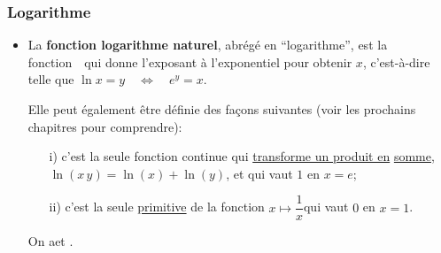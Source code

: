 \documentclass[10pt]{beamer}
\newcommand{\bitem}{\item[$\bullet$]}
\newcommand{\R}{\mathbb R}
\begin{document}
\begin{frame}[plain]
\frametitle{\bf Logarithme}
\medskip 

\begin{itemize}
\bitem
La {\bf fonction logarithme naturel}, abr\'eg\'e en ``logarithme'', 
est la fonction\ \ qui donne l'exposant \`a 
l'exponentiel pour obtenir $x$, c'est-\`a-dire telle que\quad 
$\ln x = y \quad\Leftrightarrow\quad e^y=x$. 
\vspace*{3mm}

\pause
Elle peut \'egalement \^etre d\'efinie des fa\c{c}ons suivantes 
(voir les prochains chapitres pour comprendre): 
\vspace*{2mm}

\begin{itemize}
\item[i)]
c'est la seule fonction continue qui \underline{transforme un produit en} 
\underline{somme}, $\ln(x\,y)=\ln(x)+ \ln(y)$, et qui vaut $1$ en $x=e$;
\vspace*{2mm}

\item[ii)]
c'est la seule \underline{primitive} de la fonction\quad 
$x\mapsto \dfrac{1}{x}$\quad qui vaut $0$ en $x=1$. 
\end{itemize}
\vspace*{2mm}

On a\quad \framebox{\ $D_{\ln}=]0,\infty[$\ }\quad et\quad 
\framebox{\ $I_{\ln}= \R$\ }. 
\end{itemize}

\end{frame}

\end{document}
